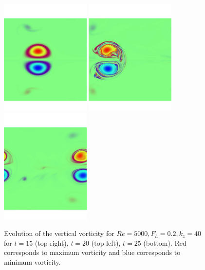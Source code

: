 \begin{figure}
\begin{center}
\includegraphics[width=0.4\textwidth]{struc_3}
\includegraphics[width=0.4\textwidth]{struc_4}
\includegraphics[width=0.4\textwidth]{struc_5}
\caption{Evolution of the vertical vorticity for $Re=5000, F_{h}=0.2, k_{z}=40$ for $t=15$ (top right), $t=20$ (top left), $t=25$ (bottom). Red corresponds to maximum vorticity and blue corresponds to minimum vorticity.}
\label{full_structure}
\end{center}
\end{figure}

